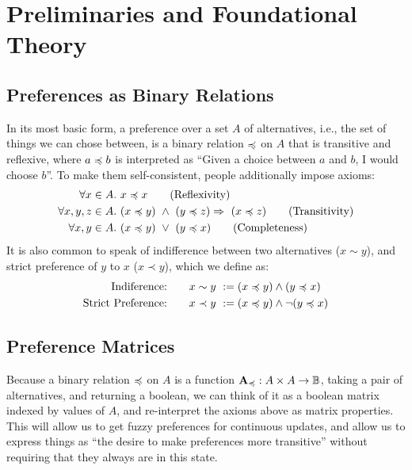 \documentclass{article}
\begin{document}
	
	
	
	
	\section{Preliminaries and Foundational Theory}
	\subsection{Preferences as Binary Relations}
	In its most basic form, a preference over a set $A$ of alternatives, i.e., the set of things we can chose between, is a binary relation $\preccurlyeq$ on $A$ that is transitive and reflexive, where $a \preccurlyeq b$ is interpreted as ``Given a choice between $a$ and $b$, I would choose $b$''. To make them self-consistent, people additionally impose axioms:
	\begin{align*}
	\forall x \in A.&~x \preccurlyeq x \tag{Reflexivity}\\
	\forall x,y,z \in A.&~(x\preccurlyeq y)~\land~( y \preccurlyeq z) \Rightarrow~(x \preccurlyeq z) \tag{Transitivity}\\
	\forall x, y \in A. &~ (x\preccurlyeq y)~\lor~( y \preccurlyeq x) \tag{Completeness}
	\end{align*}
	It is also common to speak of indifference between two alternatives ($x \sim y$), and strict preference of $y$ to $x$ ($x \prec y$), which we define as:
	\begin{align*}
		\text{Indiference:}\qquad x \sim y &~:= (x \preccurlyeq y) \land (y \preccurlyeq x)\\
		\text{Strict Preference:}\qquad x \prec y &~:= (x \preccurlyeq y) \land \lnot (y \preccurlyeq x)
	\end{align*}
	
	\subsection{Preference Matrices}
	Because a binary relation $\preccurlyeq$ on $A$ is a function $\mathbf A_\preccurlyeq: A \times A \to \mathbb{B}$, taking a pair of alternatives, and returning a boolean, we can think of it as a boolean matrix indexed by values of $A$, and re-interpret the axioms above as matrix properties. This will allow us to get fuzzy preferences for continuous updates, and allow us to express things as ``the desire to make preferences more transitive'' without requiring that they always are in this state. 
	
\end{document}
